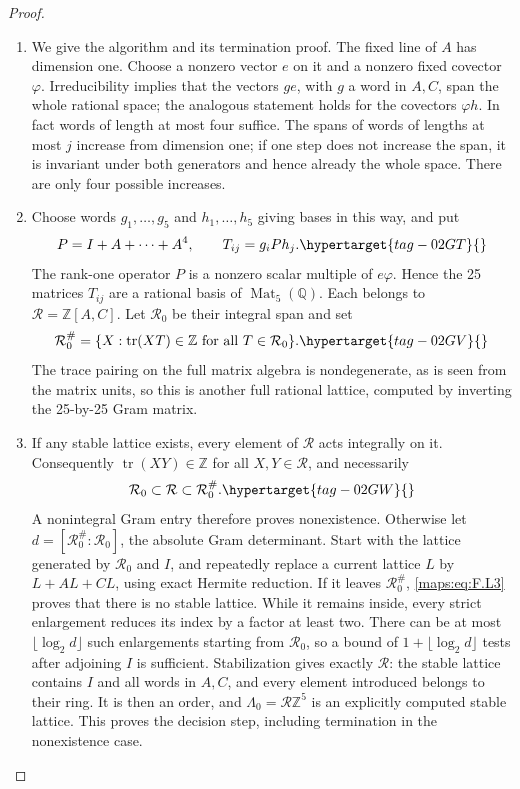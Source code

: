 \documentclass[11pt,a4paper]{article}
\numberwithin{equation}{section}
\theoremstyle{definition}
\begin{document}
\begin{proof}
\begin{enumerate}[label=\arabic*.]
\item We give the algorithm and its termination proof.
The fixed line of $A$ has dimension one.  Choose a nonzero
vector $e$ on it and a nonzero fixed covector $\varphi$.
Irreducibility implies that the vectors $ge$, with $g$ a
word in $A,C$, span the whole rational space; the analogous
statement holds for the covectors $\varphi h$.
In fact words of length at most four suffice.  The spans of
words of lengths at most $j$ increase from dimension one;
if one step does not increase the span, it is invariant
under both generators and hence already the whole space.
There are only four possible increases.

\item Choose words $g_1,\ldots,g_5$ and $h_1,\ldots,h_5$ giving
bases in this way, and put
\begin{equation}
 P=I+A+\cdots+A^4,\qquad T_{ij}=g_iPh_j.
 \hypertarget{tag-02GT}{}\label{maps:eq:F.L1}
\end{equation}
The rank-one operator $P$ is a nonzero scalar multiple of
$e\varphi$.  Hence the 25 matrices $T_{ij}$ are a rational
basis of $\operatorname{Mat}_5(\mathbb Q)$.
Each belongs to $\mathcal R=\mathbb Z[A,C]$.
Let $\mathcal R_0$ be their integral span and set
\begin{equation}
 \mathcal R_0^\#=
 \{X:\operatorname{tr}(XT)\in\mathbb Z
                     \text{ for all }T\in\mathcal R_0\}.
 \hypertarget{tag-02GV}{}\label{maps:eq:F.L2}
\end{equation}
The trace pairing on the full matrix algebra is
nondegenerate, as is seen from the matrix units, so this
is another full rational lattice, computed by inverting
the 25-by-25 Gram matrix.

\item If any stable lattice exists, every element of $\mathcal R$
acts integrally on it.  Consequently
$\operatorname{tr}(XY)\in\mathbb Z$ for all
$X,Y\in\mathcal R$, and necessarily
\begin{equation}
 \mathcal R_0\subset\mathcal R\subset\mathcal R_0^\#.
 \hypertarget{tag-02GW}{}\label{maps:eq:F.L3}
\end{equation}
A nonintegral Gram entry therefore proves nonexistence.
Otherwise let
$d=[\mathcal R_0^\#:\mathcal R_0]$, the absolute Gram
determinant.  Start with the lattice generated by
$\mathcal R_0$ and $I$, and repeatedly replace a current
lattice $L$ by $L+AL+CL$, using exact Hermite reduction.
If it leaves $\mathcal R_0^\#$, \eqref{maps:eq:F.L3} proves that there
is no stable lattice.
While it remains inside, every strict enlargement reduces
its index by a factor at least two.
There can be at most $\lfloor\log_2d\rfloor$ such
enlargements starting from $\mathcal R_0$, so a bound of
$1+\lfloor\log_2d\rfloor$ tests after adjoining $I$ is
sufficient.  Stabilization gives exactly $\mathcal R$:
the stable lattice contains $I$ and all words in $A,C$,
and every element introduced belongs to their ring.
It is then an order, and
$\Lambda_0=\mathcal R\mathbb Z^5$ is an explicitly
computed stable lattice.  This proves the decision step,
including termination in the nonexistence case.


\end{enumerate}
\end{proof}
\end{document}
